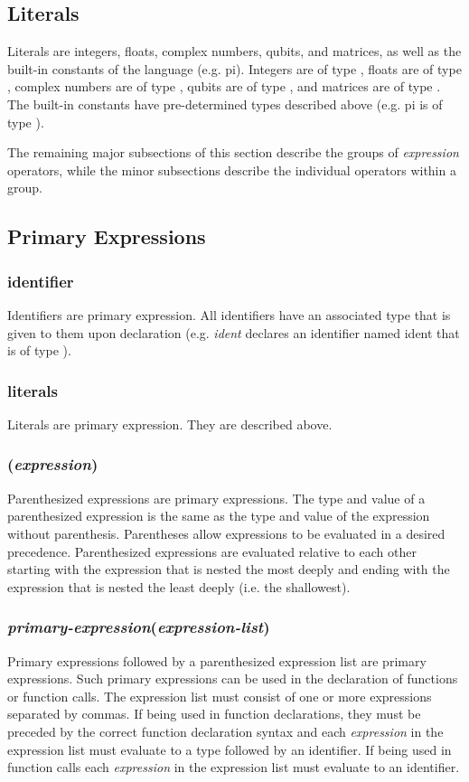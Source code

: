 
\subsection{Literals}
Literals are integers, floats, complex numbers, qubits, and matrices, as well as the built-in constants of the language (e.g. \textsf{pi}). Integers are of type \integ, floats are of type \float, complex numbers are of type \complex, qubits are of type \qubit, and matrices are of type \mat. The built-in constants have pre-determined types described above (e.g. \textsf{pi} is of type \float).

The remaining major subsections of this section describe the groups of \textit{expression} operators, while the minor subsections describe the individual operators within a group.
\subsection{Primary Expressions}
\subsubsection{identifier}
Identifiers are primary expression. All identifiers have an associated type that is given to them upon declaration (e.g. \float \textit{ident} declares an identifier named ident that is of type \float).
\subsubsection{literals}
Literals are primary expression. They are described above.

\subsubsection{(\textit{expression})}
Parenthesized expressions are primary expressions. The type and value of a parenthesized expression is the same as the type and value of the expression without parenthesis. Parentheses allow expressions to be evaluated in a desired precedence. Parenthesized expressions are evaluated relative to each other starting with the expression that is nested the most deeply and ending with the expression that is nested the least deeply (i.e. the shallowest).

\subsubsection{\textit{primary-expression}(\textit{expression-list})}
Primary expressions followed by a parenthesized expression list are primary expressions. Such primary expressions can be used in the declaration of functions or function calls. The expression list must consist of one or more expressions separated by commas. If being used in function declarations, they must be preceded by the correct function declaration syntax and each \textit{expression} in the expression list must evaluate to a type followed by an identifier. If being used in function calls each \textit{expression} in the expression list must evaluate to an identifier.

